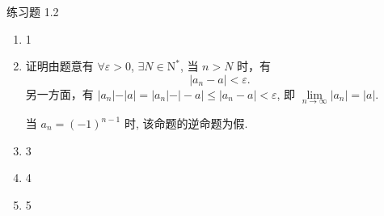 


% 

\begin{center}
    {\heiti 练习题 1.2}
\end{center}

\begin{enumerate}
    \item 1
    \item %
        {\heiti 证明}\quad 由题意有 $\forall \varepsilon > 0$, $\exists N \in \mathrm{N}^*$, 当 $n > N$ 时，有
        \begin{equation*}
            |a_n - a| < \varepsilon.
        \end{equation*}
        另一方面，有 $\vert a_n \vert - \vert a \vert = \vert a_n \vert - \vert -a \vert \leqslant \vert a_n - a \vert < \varepsilon$, 即 $\lim\limits_{n\to\infty}\vert a_n \vert = \vert a \vert$.
        
        当 $a_n = (-1)^{n-1}$ 时, 该命题的逆命题为假.
    \item 3
    \item 4
    \item 5
\end{enumerate}

% 

